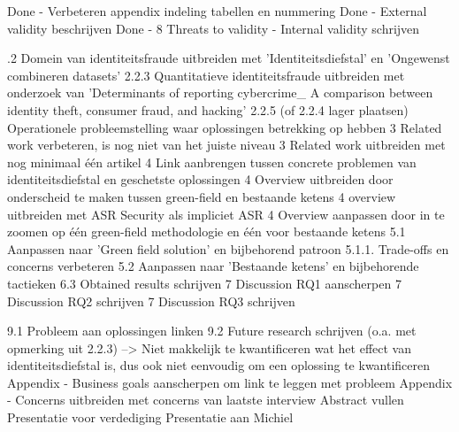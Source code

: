 \todo
Done - Verbeteren appendix indeling tabellen en nummering
Done - External validity beschrijven
Done - 8 Threats to validity - Internal validity schrijven

.2 Domein van identiteitsfraude uitbreiden met 'Identiteitsdiefstal' en 'Ongewenst combineren datasets'
2.2.3 Quantitatieve identiteitsfraude uitbreiden met onderzoek van 'Determinants of reporting cybercrime_ A
comparison between identity theft, consumer fraud, and hacking'
2.2.5 (of 2.2.4 lager plaatsen) Operationele probleemstelling waar oplossingen betrekking op hebben
3 Related work verbeteren, is nog niet van het juiste niveau
3 Related work uitbreiden met nog minimaal één artikel
4 Link aanbrengen tussen concrete problemen van identiteitsdiefstal en geschetste oplossingen
4 Overview uitbreiden door onderscheid te maken tussen green-field en bestaande ketens
4 overview uitbreiden met ASR Security als impliciet ASR
4 Overview aanpassen door in te zoomen op één green-field methodologie en één voor bestaande ketens
5.1 Aanpassen naar 'Green field solution' en bijbehorend patroon
5.1.1. Trade-offs en concerns verbeteren
5.2 Aanpassen naar 'Bestaande ketens' en bijbehorende tactieken
6.3 Obtained results schrijven
7 Discussion RQ1 aanscherpen
7 Discussion RQ2 schrijven
7 Discussion RQ3 schrijven

9.1 Probleem aan oplossingen linken
9.2 Future research schrijven (o.a. met opmerking uit 2.2.3) --> Niet makkelijk te kwantificeren wat het effect van identiteitsdiefstal is, dus ook niet eenvoudig om een oplossing te kwantificeren
Appendix - Business goals aanscherpen om link te leggen met probleem
Appendix - Concerns uitbreiden met concerns van laatste interview
Abstract vullen
Presentatie voor verdediging
Presentatie aan Michiel